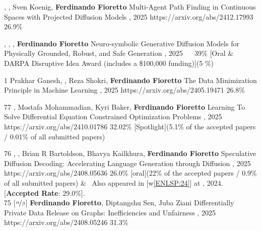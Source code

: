 \begin{pubs}
\confentry
	{} 
	{, , {Sven Koenig}, {\bf Ferdinando Fioretto}}
	{Multi-Agent Path Finding in Continuous Spaces with Projected Diffusion Models}
	{\procICML, 2025}
	{https://arxiv.org/abs/2412.17993}
	{26.9\%} %
	
\confentryAwd
	{} 
	{, , , {\bf Ferdinando Fioretto}}
	{Neuro-symbolic Generative Diffusion Models for Physically Grounded, Robust, and Safe Generation}
	{, 2025}
	{~}
	{~39\%} %
	{[Oral \& DARPA Disruptive Idea Award (includes a \$100,000 funding)]}{(5 \%)}
	
\confentry
	{1}
	{Prakhar Ganesh, , Reza Shokri, {\bf Ferdinando Fioretto}}
	{The Data Minimization Principle in Machine Learning}
	{\procFAccT, 2025}
	{https://arxiv.org/abs/2405.19471}
	{26.8\%} %

\confentryAwd
	{77}
	{, Mostafa Mohammadian, Kyri Baker, {\bf Ferdinando Fioretto}}
	{Learning To Solve Differential Equation Constrained Optimization Problems}
	{\procICLR, 2025}
	{https://arxiv.org/abs/2410.01786}
	{32.02\%} %
	{[Spotlight]}{(5.1\% of the accepted papers / 0.01\% of all submitted papers)}

\confentryAwd
	{76}
	{, , Brian R Bartoldson, Bhavya Kailkhura, {\bf Ferdinando Fioretto}}
	{Speculative Diffusion Decoding: Accelerating Language Generation through Diffusion}
	{\procNAACL, 2025}
	{https://arxiv.org/abs/2408.05636}
	{26.0\%}
	{[oral]}{(22\% of the accepted papers / 0.9\% of all submitted papers)}
&	\hspace{4pt} \faAngleRight\, Also appeared in [w\ref{ENLSP:24}] at , 2024.
	\hspace{4pt} {[{\bf Accepted Rate}: 29.0\%].}\\[0.5em]

\confentry
	{75}
	{[$\nicefrac{\alpha}{\beta}$] {\bf Ferdinando Fioretto}, Diptangshu Sen, Juba Ziani}
	{Differentially Private Data Release on Graphs: Inefficiencies and Unfairness}
	{\procAISTATS, 2025}
	{https://arxiv.org/abs/2408.05246}
	{31.3\%} %


\end{pubs}
